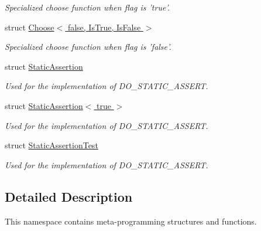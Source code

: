 \begin{DoxyCompactItemize}
\begin{DoxyCompactList}\small\item\em Specialized choose function when flag is 'true'. \end{DoxyCompactList}\item 
struct \hyperlink{struct_d_o_1_1_meta_1_1_choose_3_01false_00_01_is_true_00_01_is_false_01_4}{Choose$<$ false, Is\-True, Is\-False $>$}
\begin{DoxyCompactList}\small\item\em Specialized choose function when flag is 'false'. \end{DoxyCompactList}\item 
struct \hyperlink{struct_d_o_1_1_meta_1_1_static_assertion}{Static\-Assertion}
\begin{DoxyCompactList}\small\item\em Used for the implementation of D\-O\-\_\-\-S\-T\-A\-T\-I\-C\-\_\-\-A\-S\-S\-E\-R\-T. \end{DoxyCompactList}\item 
struct \hyperlink{struct_d_o_1_1_meta_1_1_static_assertion_3_01true_01_4}{Static\-Assertion$<$ true $>$}
\begin{DoxyCompactList}\small\item\em Used for the implementation of D\-O\-\_\-\-S\-T\-A\-T\-I\-C\-\_\-\-A\-S\-S\-E\-R\-T. \end{DoxyCompactList}\item 
struct \hyperlink{struct_d_o_1_1_meta_1_1_static_assertion_test}{Static\-Assertion\-Test}
\begin{DoxyCompactList}\small\item\em Used for the implementation of D\-O\-\_\-\-S\-T\-A\-T\-I\-C\-\_\-\-A\-S\-S\-E\-R\-T. \end{DoxyCompactList}\end{DoxyCompactItemize}


\subsection{Detailed Description}
This namespace contains meta-\/programming structures and functions. 